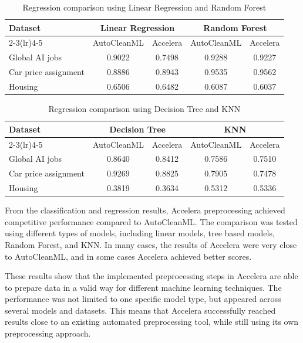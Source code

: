 \documentclass[12pt,a4paper,oneside]{report}
\begin{document}
\begin{table}[H]
\centering
\small
\caption{Regression comparison using Linear Regression and Random Forest}
\label{tab:regression-lr-rf-autoclean-accelera}
\begin{tabular}{p{}cccc}
\toprule
Dataset & \multicolumn{2}{c}{Linear Regression} & \multicolumn{2}{c}{Random Forest} \\
\cmidrule(lr){2-3}\cmidrule(lr){4-5}
 & AutoCleanML & Accelera & AutoCleanML & Accelera \\
\midrule
Global AI jobs & 0.9022 & 0.7498 & 0.9288 & 0.9227 \\
Car price assignment & 0.8886 & 0.8943 & 0.9535 & 0.9562 \\
Housing & 0.6506 & 0.6482 & 0.6087 & 0.6037 \\
\bottomrule
\end{tabular}
\end{table}

\begin{table}[H]
\centering
\small
\caption{Regression comparison using Decision Tree and KNN}
\label{tab:regression-dt-knn-autoclean-accelera}
\begin{tabular}{p{}cccc}
\toprule
Dataset & \multicolumn{2}{c}{Decision Tree} & \multicolumn{2}{c}{KNN} \\
\cmidrule(lr){2-3}\cmidrule(lr){4-5}
 & AutoCleanML & Accelera & AutoCleanML & Accelera \\
\midrule
Global AI jobs & 0.8640 & 0.8412 & 0.7586 & 0.7510 \\
Car price assignment & 0.9269 & 0.8825 & 0.7905 & 0.7478 \\
Housing & 0.3819 & 0.3634 & 0.5312 & 0.5336 \\
\bottomrule
\end{tabular}
\end{table}

\noindent From the classification and regression results, Accelera preprocessing achieved
competitive performance compared to AutoCleanML. The comparison was tested using
different types of models, including linear models, tree based models, Random
Forest, and KNN. In many cases, the results of Accelera were very close to
AutoCleanML, and in some cases Accelera achieved better scores.

\noindent These results show that the implemented preprocessing steps in Accelera are able
to prepare data in a valid way for different machine learning techniques. The
performance was not limited to one specific model type, but appeared across
several models and datasets. This means that Accelera successfully reached
results close to an existing automated preprocessing tool, while still using its
own preprocessing approach.
\end{document}
